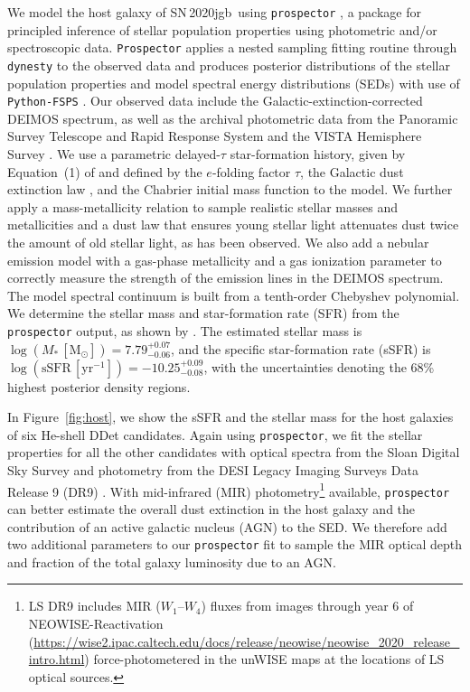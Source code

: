 \documentclass[twocolumn]{aastex631}
\newcommand{\sn}{SN\,2020jgb}
\newcommand{\Msun}{\mathrm{M_\odot}}
\begin{document}
We model the host galaxy of \sn\ using \texttt{prospector} \citep{Johnson_prospector_2021}, a package for principled inference of stellar population properties using photometric and/or spectroscopic data. \texttt{Prospector} applies a nested sampling fitting routine through \texttt{dynesty} \citep{Speagle_dynesty_2020} to the observed data and produces posterior distributions of the stellar population properties and model spectral energy distributions (SEDs) with use of \texttt{Python-FSPS} \citep{Conroy_2009,Conroy_2010}. Our observed data include the Galactic-extinction-corrected DEIMOS spectrum, as well as the archival photometric data from the Panoramic Survey Telescope and Rapid Response System \citep[Pan-STARRS;][$g$, $r$, $i$, $z$, $y$ Kron magnitudes]{PS1_2016}  and the VISTA Hemisphere Survey \citep[VHS;][$J$ and $K_s$ Petrosian magnitudes]{VHS_2013}. We use a parametric delayed-$\tau$ star-formation history, given by Equation~(1) of \citet{Nugent_2020} and defined by the $e$-folding factor $\tau$, the Galactic dust extinction law \citep{Cardelli_1989}, and the Chabrier initial mass function \citep{Chabrier_2003} to the model. We further apply a mass-metallicity relation \citep{Gallazzi_2005} to sample realistic stellar masses and metallicities and a dust law that ensures young stellar light attenuates dust twice the amount of old stellar light, as has been observed.  We also add a nebular emission model \citep{Byler_2017} with a gas-phase metallicity and a gas ionization parameter to correctly measure the strength of the emission lines in the DEIMOS spectrum. The model spectral continuum is built from a tenth-order Chebyshev polynomial. We determine the stellar mass and star-formation rate (SFR) from the \texttt{prospector} output, as shown by \citet{Nugent_2022}. The estimated stellar mass is $\log (M_*\,[\Msun])=7.79_{-0.06}^{+0.07}$, and the specific star-formation rate (sSFR) is $\log (\mathrm{sSFR}\,[\mathrm{yr}^{-1}])=-10.25_{-0.08}^{+0.09}$, with the uncertainties denoting the 68\% highest posterior density regions.
  
In Figure~\ref{fig:host}, we show the sSFR and the stellar mass for the host galaxies of six He-shell DDet candidates. Again using \texttt{prospector}, we fit the stellar properties for all the other candidates with optical spectra from the Sloan Digital Sky Survey \citep[SDSS;][]{York_2000} and photometry from the DESI Legacy Imaging Surveys Data Release 9 (DR9) \citep[LS;][$g$, $r$, $z$, $W_1$, $W_2$, $W_3$, $W_4$ magnitudes]{Dey_2019}. With mid-infrared (MIR) photometry\footnote{LS DR9 includes MIR ($W_1$--$W_4$) fluxes from images through year 6 of NEOWISE-Reactivation (\url{https://wise2.ipac.caltech.edu/docs/release/neowise/neowise_2020_release_intro.html}) force-photometered in the unWISE \citep{Meisner_unwise_2018} maps at the locations of LS optical sources.} available, \texttt{prospector} can better estimate the overall dust extinction in the host galaxy and the contribution of an active galactic nucleus (AGN) to the SED. We therefore add two additional parameters to our \texttt{prospector} fit to sample the MIR optical depth and fraction of the total galaxy luminosity due to an AGN.
\end{document}
